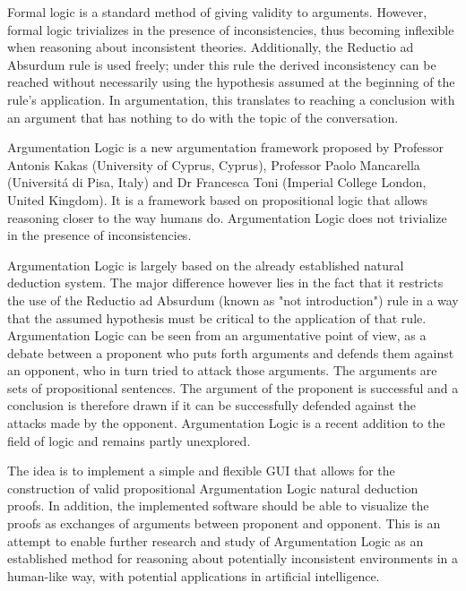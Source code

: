 \documentclass[11pt,twoside,a4paper]{report}
\begin{document}
Formal logic is a standard method of giving validity to arguments. However, formal logic trivializes in the presence of inconsistencies, thus becoming inflexible when reasoning about inconsistent theories. Additionally, the Reductio ad Absurdum rule is used freely; under this rule the derived inconsistency can be reached without necessarily using the hypothesis assumed at the beginning of the rule's application. In argumentation, this translates to reaching a conclusion with an argument that has nothing to do with the topic of the conversation.

Argumentation Logic is a new argumentation framework proposed by Professor Antonis Kakas (University of Cyprus, Cyprus), Professor Paolo Mancarella (Universit\'a di Pisa, Italy) and Dr Francesca Toni (Imperial College London, United Kingdom). It is a framework based on propositional logic that allows reasoning closer to the way humans do. Argumentation Logic does not trivialize in the presence of inconsistencies.

Argumentation Logic is largely based on the already established natural deduction system. The major difference however lies in the fact that it restricts the use of the Reductio ad Absurdum (known as "not introduction") rule in a way that the assumed hypothesis must be critical to the application of that rule. Argumentation Logic can be seen from an argumentative point of view, as a debate between a proponent who puts forth arguments and defends them against an opponent, who in turn tried to attack those arguments. The arguments are sets of propositional sentences. The argument of the proponent is successful and a conclusion is therefore drawn if it can be successfully defended against the attacks made by the opponent. Argumentation Logic is a recent addition to the field of logic and remains partly unexplored.

The idea is to implement a simple and flexible GUI that allows for the construction of valid propositional Argumentation Logic natural deduction proofs. In addition, the implemented software should be able to visualize the proofs as exchanges of arguments between proponent and opponent. This is an attempt to enable further research and study of Argumentation Logic as an established method for reasoning about potentially inconsistent environments in a human-like way, with potential applications in artificial intelligence.
\end{document}
